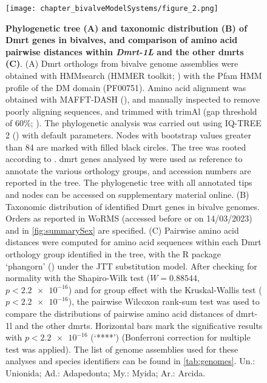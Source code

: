 \begin{figure}[t!]
	\centering
	\texttt{[image: chapter\_bivalveModelSystems/figure\_2.png]}
	\captionsetup[subfigure]{labelformat=nocaption}
	\begin{subfigure}{0\linewidth}
	\caption{}\label{fig:dmrt-A}
	\end{subfigure}%
	\begin{subfigure}{0\linewidth}
	\caption{}\label{fig:dmrt-B}
	\end{subfigure}%
	\begin{subfigure}{0\linewidth}
	\caption{}\label{fig:dmrt-C}
	\end{subfigure}%
	\caption[\textbf{Phylogenetic tree (A) and taxonomic distribution (B) of Dmrt genes in bivalves, and comparison of amino acid pairwise distances within \textit{Dmrt-1L} and the other \glspl{dmrt} (B)}]
	{
		\textbf{Phylogenetic tree (A) and taxonomic distribution (B) of Dmrt genes in bivalves, and comparison of amino acid pairwise distances within \textit{Dmrt-1L} and the other \glspl{dmrt} (C)}. (A) Dmrt orthologs from bivalve genome assemblies were obtained with HMMsearch (HMMER toolkit; ) with the Pfam HMM profile of the DM domain (PF00751). Amino acid alignment was obtained with MAFFT-DASH (), and manually inspected to remove poorly aligning sequences, and trimmed with trimAl (gap threshold of 60\%; ). The phylogenetic analysis was carried out using IQ-TREE 2 () with default parameters. Nodes with bootstrap values greater than 84 are marked with filled black circles. The tree was rooted according to . \gls{dmrt} genes analysed by  were used as reference to annotate the various orthology groups, and accession numbers are reported in the tree. The phylogenetic tree with all annotated tips and nodes can be accessed on supplementary material online. (B) Taxonomic distribution of identified Dmrt genes in bivalve genomes. Orders as reported in WoRMS (accessed before or on 14/03/2023) and in \cref{fig:summarySex} are specified. (C) Pairwise amino acid distances were computed for amino acid sequences within each Dmrt orthology group identified in the tree, with the R package ‘phangorn’ () under the JTT substitution model. After checking for normality with the Shapiro-Wilk test ($W = 0.88544$, $p < \num{2.2e-16}$) and for group effect with the Kruskal-Wallis test ($p < \num{2.2e-16}$), the pairwise Wilcoxon rank-sum test was used to compare the distributions of pairwise amino acid distances of \gls{dmrt-1l} and the other \glspl{dmrt}. Horizontal bars mark the significative results with $p < \num{2.2e-16}$ (‘****’) (Bonferroni correction for multiple test was applied). The list of genome assemblies used for these analyses and species identifiers can be found in \cref{tab:genomes}. Un.: Unionida; Ad.: Adapedonta; My.: Myida; Ar.: Arcida.
	}

	\label{fig:dmrt}
\end{figure}

